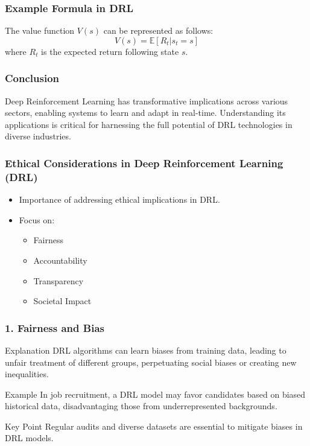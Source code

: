\documentclass[aspectratio=169]{beamer}
\begin{document}
\begin{frame}[fragile]
    \frametitle{Example Formula in DRL}
    The value function \( V(s) \) can be represented as follows:
    \begin{equation}
        V(s) = \mathbb{E} [R_t | s_t = s]
    \end{equation}
    where \( R_t \) is the expected return following state \( s \).
\end{frame}

\begin{frame}[fragile]
    \frametitle{Conclusion}
    Deep Reinforcement Learning has transformative implications across various sectors, enabling systems to learn and adapt in real-time. Understanding its applications is critical for harnessing the full potential of DRL technologies in diverse industries.
\end{frame}

\begin{frame}[fragile]
    \frametitle{Ethical Considerations in Deep Reinforcement Learning (DRL)}
    \begin{itemize}
        \item Importance of addressing ethical implications in DRL.
        \item Focus on:
        \begin{itemize}
            \item Fairness
            \item Accountability
            \item Transparency
            \item Societal Impact
        \end{itemize}
    \end{itemize}
\end{frame}

\begin{frame}[fragile]
    \frametitle{1. Fairness and Bias}
    \begin{block}{Explanation}
        DRL algorithms can learn biases from training data, leading to unfair treatment of different groups, perpetuating social biases or creating new inequalities.
    \end{block}
    \begin{block}{Example}
        In job recruitment, a DRL model may favor candidates based on biased historical data, disadvantaging those from underrepresented backgrounds.
    \end{block}
    \begin{block}{Key Point}
        Regular audits and diverse datasets are essential to mitigate biases in DRL models.
    \end{block}
\end{frame}
\end{document}
